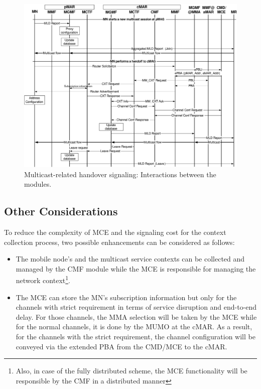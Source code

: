 \begin{figure}[t!]
 	\begin{center} 
		\includegraphics[width=1.05\textwidth]{./Part3/Chapter8/figures/c10_multicast_signaling.eps}
		\caption{Multicast-related handover signaling: Interactions between the modules.}
		\label{fig:c10_multicast_signaling}
	\end{center}
\end{figure}

\subsection{Other Considerations}
To reduce the complexity of MCE and the signaling cost for the context collection process, two possible enhancements can be considered as follows:
\begin{itemize}
\item The mobile node's  and the multicast service contexts can be collected and managed by the CMF module while the MCE is responsible for managing the network context\footnote{Also, in case of the fully distributed scheme, the MCE functionality will be responsible by the CMF in a distributed manner}. 
\item The MCE can store the MN's subscription information but only for the channels with strict requirement in terms of service disruption and end-to-end delay. For those channels, the MMA selection will be taken by the MCE while for the normal channels, it is done by the MUMO at the cMAR. As a result, for the channels with the strict requirement, the channel configuration will be conveyed via the extended PBA from the CMD/MCE to the cMAR. 
\end{itemize} 
